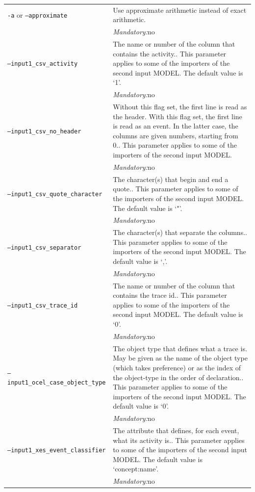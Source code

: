 {\begin{tabularx}{\linewidth}{lX}
\texttt{-a} or \texttt{--approximate} & Use approximate arithmetic instead of exact arithmetic.\\
&\textit{Mandatory:}\quad no\\
\texttt{--input1\_csv\_activity} & The name or number of the column that contains the activity.. This parameter applies to some of the importers of the second input MODEL. The default value is `1'.\\
&\textit{Mandatory:}\quad no\\
\texttt{--input1\_csv\_no\_header} & Without this flag set, the first line is read as the header. 
    With this flag set, the first line is read as an event. In the latter case, the columns are given numbers, starting from 0.. This parameter applies to some of the importers of the second input MODEL. \\
&\textit{Mandatory:}\quad no\\
\texttt{--input1\_csv\_quote\_character} & The character(s) that begin and end a quote.. This parameter applies to some of the importers of the second input MODEL. The default value is `"'.\\
&\textit{Mandatory:}\quad no\\
\texttt{--input1\_csv\_separator} & The character(s) that separate the columns.. This parameter applies to some of the importers of the second input MODEL. The default value is `,'.\\
&\textit{Mandatory:}\quad no\\
\texttt{--input1\_csv\_trace\_id} & The name or number of the column that contains the trace id.. This parameter applies to some of the importers of the second input MODEL. The default value is `0'.\\
&\textit{Mandatory:}\quad no\\
\texttt{--input1\_ocel\_case\_object\_type} & The object type that defines what a trace is. May be given as the name of the object type (which takes preference) or as the index of the object-type in the order of declaration.. This parameter applies to some of the importers of the second input MODEL. The default value is `0'.\\
&\textit{Mandatory:}\quad no\\
\texttt{--input1\_xes\_event\_classifier} & The attribute that defines, for each event, what its activity is.. This parameter applies to some of the importers of the second input MODEL. The default value is `concept:name'.\\
&\textit{Mandatory:}\quad no\\

\end{tabularx}}
